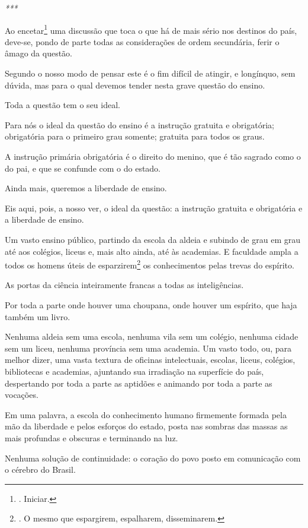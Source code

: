\emph{***}

Ao encetar\footnote{. Iniciar.} uma discussão que toca o que há de mais
sério nos destinos do país, deve-se, pondo de parte todas as
considerações de ordem secundária, ferir o âmago da questão.

Segundo o nosso modo de pensar este é o fim difícil de atingir, e
longínquo, sem dúvida, mas para o qual devemos tender nesta grave
questão do ensino.

Toda a questão tem o seu ideal.

Para nós o ideal da questão do ensino é a instrução gratuita e
obrigatória; obrigatória para o primeiro grau somente; gratuita para
todos os graus.

A instrução primária obrigatória é o direito do menino, que é tão
sagrado como o do pai, e que se confunde com o do estado.

Ainda mais, queremos a liberdade de ensino.

Eis aqui, pois, a nosso ver, o ideal da questão: a instrução gratuita e
obrigatória e a liberdade de ensino.

Um vasto ensino público, partindo da escola da aldeia e subindo de grau
em grau até aos colégios, liceus e, mais alto ainda, até às academias. E
faculdade ampla a todos os homens úteis de esparzirem\footnote{. O mesmo
  que espargirem, espalharem, disseminarem.} os conhecimentos pelas
trevas do espírito.

As portas da ciência inteiramente francas a todas as inteligências.

Por toda a parte onde houver uma choupana, onde houver um espírito, que
haja também um livro.

Nenhuma aldeia sem uma escola, nenhuma vila sem um colégio, nenhuma
cidade sem um liceu, nenhuma província sem uma academia. Um vasto todo,
ou, para melhor dizer, uma vasta textura de oficinas intelectuais,
escolas, liceus, colégios, bibliotecas e academias, ajuntando sua
irradiação na superfície do país, despertando por toda a parte as
aptidões e animando por toda a parte as vocações.

Em uma palavra, a escola do conhecimento humano firmemente formada pela
mão da liberdade e pelos esforços do estado, posta nas sombras das
massas as mais profundas e obscuras e terminando na luz.

Nenhuma solução de continuidade: o coração do povo posto em comunicação
com o cérebro do Brasil.

